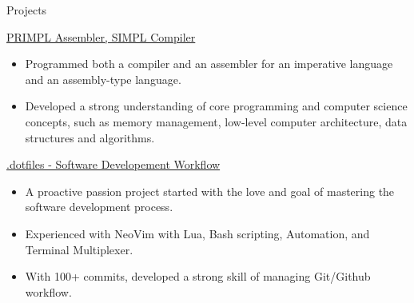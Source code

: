 \documentclass{article}
\newlength{\tabin}
\newlength{\secsep}
\newcommand{\lineunder}{\vspace*{-8pt} \\ \hspace*{-6pt} \hrulefill \\ \vspace*{-15pt}}
\newenvironment{tabbedsection}[1]{
  \begin{list}{}{
      \setlength{\itemsep}{0pt}
      \setlength{\labelsep}{0pt}
      \setlength{\labelwidth}{0pt}
      \setlength{\leftmargin}{\tabin}
      \setlength{\rightmargin}{\tabin}
      \setlength{\listparindent}{0pt}
      \setlength{\parsep}{0pt}
      \setlength{\parskip}{0pt}
      \setlength{\partopsep}{0pt}
      \setlength{\topsep}{#1}
    }
  \item[]
}{\end{list}}
\newenvironment{resume_section}[1]{
  \filbreak
  \vspace{2\secsep}
  \textsc{\large#1}
  \lineunder
  \begin{tabbedsection}{\secsep}
}{\end{tabbedsection}}
\newenvironment{resume_subsection}[2][]{
  \textbf{#2} \hfill {\footnotesize #1} \hspace{-5.1em}
  \begin{tabbedsection}{0.5\secsep}
}{\end{tabbedsection}}
\newenvironment{subitems}{
  \renewcommand{\labelitemi}{-}
  \begin{itemize}
      \setlength{\labelsep}{1em}
}{\end{itemize}}
\begin{document}
\begin{resume_section}{Projects}
  \begin{resume_subsection}[]{\href{}{PRIMPL Assembler, SIMPL Compiler}}
   \begin{subitems}
     \item Programmed both a compiler and an assembler for an imperative language and an assembly-type language.
     \item Developed a strong understanding of core programming and computer science concepts, such as memory management,
           low-level computer architecture, data structures and algorithms.
    \end{subitems}
  \end{resume_subsection}



  \begin{resume_subsection}[]{\href{https://github.com/TwinkletoesZen/.dotfiles}{.dotfiles - Software Developement Workflow \faGithub}}
    \begin{subitems}
      \item A proactive passion project started with the love and goal of mastering the software development process.
      \item Experienced with NeoVim with Lua, Bash scripting, Automation, and Terminal Multiplexer.
      \item With 100+ commits, developed a strong skill of managing Git/Github workflow.
    \end{subitems}
  \end{resume_subsection}



\end{resume_section}
\end{document}
